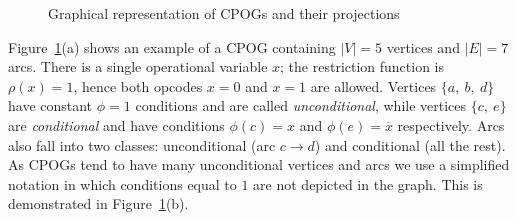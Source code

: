 \begin{figure}[h]
\begin{centering}
\par\end{centering}

\caption{\label{fig-cpog-examples}Graphical representation of CPOGs and their projections}
\end{figure}


Figure~\ref{fig-cpog-examples}(a) shows an example of a CPOG containing
$|V|=5$ vertices and $|E|=7$ arcs. There is a single operational
variable $x$; the restriction function is $\rho(x)=1$, hence both
opcodes $x=0$ and $x=1$ are allowed. Vertices $\{a,\ b,\ d\}$ have
constant $\phi=1$ conditions and are called \emph{unconditional},
while vertices $\{c,\ e\}$ are \emph{conditional} and have conditions
$\phi(c)=x$ and $\phi(e)=\overline{x}$ respectively. Arcs also fall
into two classes: unconditional (arc $c\rightarrow d$) and conditional
(all the rest). As CPOGs tend to have many unconditional vertices
and arcs we use a simplified notation in which conditions equal to
$1$ are not depicted in the graph. This is demonstrated in Figure~\ref{fig-cpog-examples}(b).

